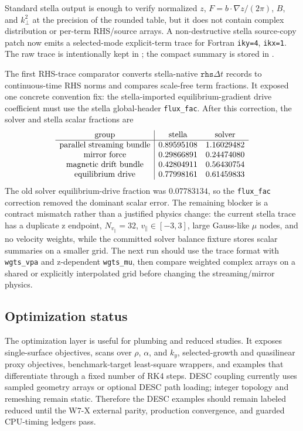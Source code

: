 \documentclass[11pt,a4paper]{article}
\begin{document}
Standard stella output is enough to verify normalized \(z\), \(F=b\cdot\nabla
z/(2\pi)\), \(B\), and \(k_\perp^2\) at the precision of the rounded
 table, but it does not contain complex distribution or
per-term RHS/source arrays.  A non-destructive stella source-copy patch now
emits a selected-mode explicit-term trace for Fortran \texttt{iky=4},
\texttt{ikx=1}.  The raw trace is intentionally kept in ; the compact
summary is stored in
.

The first RHS-trace comparator converts stella-native
\(\texttt{rhs}\Delta t\) records to continuous-time RHS norms and compares
scale-free term fractions.  It exposed one concrete convention fix:
the stella-imported equilibrium-gradient drive coefficient must use the
stella global-header \texttt{flux\_fac}.  After this correction, the solver
and stella scalar fractions are
\[
\begin{array}{c|cc}
\hbox{group} & \hbox{stella} & \hbox{solver}\\
\hline
\hbox{parallel streaming bundle} & 0.89595108 & 1.16029482\\
\hbox{mirror force} & 0.29866891 & 0.24474080\\
\hbox{magnetic drift bundle} & 0.42804911 & 0.56430754\\
\hbox{equilibrium drive} & 0.77998161 & 0.61459833
\end{array}
\]
The old solver equilibrium-drive fraction was \(0.07783134\), so the
\texttt{flux\_fac} correction removed the dominant scalar error.  The remaining
blocker is a contract mismatch rather than a justified physics change: the
current stella trace has a duplicate z endpoint, \(N_{v_\parallel}=32\),
\(v_\parallel\in[-3,3]\), large Gauss-like \(\mu\) nodes, and no velocity
weights, while the committed solver balance fixture stores scalar summaries on
a smaller grid.  The next run should use the trace format with \texttt{wgts\_vpa}
and z-dependent \texttt{wgts\_mu}, then compare weighted complex arrays on a
shared or explicitly interpolated grid before changing the streaming/mirror
physics.

\subsection{Optimization status}

The optimization layer is useful for plumbing and reduced studies.  It exposes
single-surface objectives, scans over \(\rho\), \(\alpha\), and \(k_y\),
selected-growth and quasilinear proxy objectives, benchmark-target least-square
wrappers, and examples that differentiate through a fixed number of RK4 steps.
DESC coupling currently uses sampled geometry arrays or optional DESC path
loading; integer topology and remeshing remain static.  Therefore the DESC
examples should remain labeled reduced until the W7-X external parity,
production convergence, and guarded CPU-timing ledgers pass.
\end{document}
